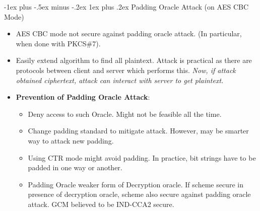 \documentclass[10pt, landscape]{article}
\makeatletter
\renewcommand{\subsubsection}{\@startsection{subsubsection}{3}{0mm}%
                                {-1ex plus -.5ex minus -.2ex}%
                                {1ex plus .2ex}%
                                {\normalfont\small\bfseries}}
\makeatother
\begin{document}
\begin{multicols*}{3}
\subsubsection{Padding Oracle Attack (on AES CBC Mode)}
\begin{itemize}
\item AES CBC mode not secure against padding oracle attack. (In particular, when done with PKCS\#7).
\item Easily extend algorithm to find all plaintext. Attack is practical as there are protocols between client and server which performs this. \textit{Now, if attack obtained ciphertext, attack can interact with server to get plaintext.}
\item \textbf{Prevention of Padding Oracle Attack}:
	\begin{itemize}
	\item Deny access to such Oracle. Might not be feasible all the time.
	\item Change padding standard to mitigate attack. However, may be smarter way to attack new padding.
	\item Using CTR mode might avoid padding. In practice, bit strings have to be padded in one way or another.
	\item Padding Oracle weaker form of Decryption oracle. If scheme secure in presence of decryption oracle, scheme also secure against padding oracle attack. GCM believed to be IND-CCA2 secure.
	\end{itemize}
\end{itemize}

\columnbreak

\end{multicols*}
\end{document}
